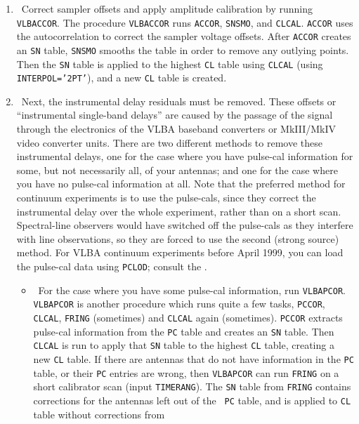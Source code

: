 \begin{enumerate}

\item\ {Correct sampler offsets and apply amplitude calibration by
running {\tt VLBACCOR}\@.  The procedure {\tt VLBACCOR} runs
{\tt ACCOR}, {\tt SNSMO}, and {\tt CLCAL}. {\tt ACCOR} uses the
autocorrelation to correct the sampler voltage offsets.  After
{\tt ACCOR} creates an {\tt SN} table, {\tt SNSMO} smooths the table
in order to remove any outlying points.  Then the {\tt SN} table is
applied to the highest {\tt CL} table using {\tt CLCAL} (using {\tt
INTERPOL='2PT'}), and a new {\tt CL} table is created.}


\item\ {Next, the instrumental delay residuals must be removed.  These
offsets or ``instrumental single-band delays'' are caused by the
passage of the signal through the electronics of the VLBA baseband
converters or MkIII/MkIV video converter units.  There are two
different methods to remove these instrumental delays, one for the
case where you have pulse-cal information for some, but not
necessarily all, of your antennas; and one for the case where you have
no pulse-cal information at all.  Note that the preferred method for
continuum experiments is to use the pulse-cals, since they correct the
instrumental delay over the whole experiment, rather than on a short
scan.  Spectral-line observers would have switched off the pulse-cals
as they interfere with line observations, so they are forced to use
the second (strong source) method.  For VLBA continuum experiments
before April 1999, you can load the pulse-cal data using {\tt PCLOD};
consult the \@.}
\begin{itemize}
\item\ {For the case where you have some pulse-cal information, run
{\tt VLBAPCOR}\@.  {\tt VLBAPCOR} is another procedure which runs
quite a few tasks, {\tt PCCOR}, {\tt CLCAL}, {\tt FRING} (sometimes)
and {\tt CLCAL} again (sometimes).  {\tt PCCOR} extracts pulse-cal
information from the {\tt PC} table and creates an {\tt SN} table.
Then {\tt CLCAL} is run to apply that {\tt SN} table to the highest
{\tt CL} table, creating a new {\tt CL} table.  If there are antennas
that do not have information in the {\tt PC} table, or their {\tt PC}
entries are wrong, then {\tt VLBAPCOR} can run {\tt FRING} on a short
calibrator scan (input {\tt TIMERANG})\@.  The {\tt SN} table from
{\tt FRING} contains corrections for the antennas left out of the {\tt
PC} table, and is applied to {\tt CL} table without corrections from
}
\end{itemize}
\end{enumerate}
